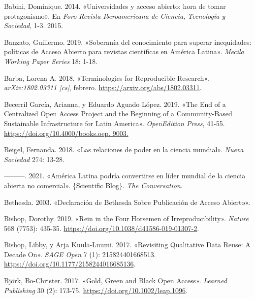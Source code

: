\documentclass[
  spanish,
  a4paper,
  oneside]{scrbook}
\newlength{\cslhangindent}
\newenvironment{CSLReferences}[2] %
 {\begin{list}{}{%
  \setlength{\itemindent}{0pt}
  \setlength{\leftmargin}{0pt}
  \setlength{\parsep}{0pt}
  \ifodd #1
   \setlength{\leftmargin}{\cslhangindent}
   \setlength{\itemindent}{-1\cslhangindent}
  \fi
  \setlength{\itemsep}{#2\baselineskip}}}
 {\end{list}}
\begin{document}
\begin{CSLReferences}{1}{0}
Babini, Dominique. 2014. {«{Universidades y acceso abierto: hora de
tomar protagonismo}»}. En \emph{{Foro Revista Iberoamericana de Ciencia,
Tecnolog{í}a y Sociedad}}, 1-3. 2015.

Banzato, Guillermo. 2019. {«{Soberan{í}a del conocimiento para superar
inequidades: pol{í}ticas de Acceso Abierto para revistas cient{í}ficas
en Am{é}rica Latina}»}. \emph{Mecila Working Paper Series} 18: 1-18.

Barba, Lorena A. 2018. {«Terminologies for {Reproducible Research}»}.
\emph{arXiv:1802.03311 {[}cs{]}}, febrero.
\url{https://arxiv.org/abs/1802.03311}.

Becerril García, Arianna, y Eduardo Aguado López. 2019. {«The {End} of a
{Centralized Open Access Project} and the {Beginning} of a
{Community-Based Sustainable Infrastructure} for {Latin America}»}.
\emph{OpenEdition Press}, 41-55.
\href{https://doi.org/10.4000/books.oep.\%209003.}{https://doi.org/10.4000/books.oep.
9003.}

Beigel, Fernanda. 2018. {«{Las relaciones de poder en la ciencia
mundial}»}. \emph{Nueva Sociedad} 274: 13-28.

---------. 2021. {«{Am{é}rica Latina podr{í}a convertirse en l{í}der
mundial de la ciencia abierta no comercial}»}. \{Scientific Blog\}.
\emph{The Conversation}.

Bethesda. 2003. {«Declaraci{ó}n de {Bethesda} Sobre Publicaci{ó}n de
Acceso Abierto»}.

Bishop, Dorothy. 2019. {«Rein in the Four Horsemen of
Irreproducibility»}. \emph{Nature} 568 (7753): 435-35.
\url{https://doi.org/10.1038/d41586-019-01307-2}.

Bishop, Libby, y Arja Kuula-Luumi. 2017. {«Revisiting {Qualitative Data
Reuse}: {A Decade On}»}. \emph{SAGE Open} 7 (1): 215824401668513.
\url{https://doi.org/10.1177/2158244016685136}.

Björk, Bo-Christer. 2017. {«Gold, {Green} and {Black Open Access}»}.
\emph{Learned Publishing} 30 (2): 173-75.
\url{https://doi.org/10.1002/leap.1096}.


\end{CSLReferences}
\end{document}
